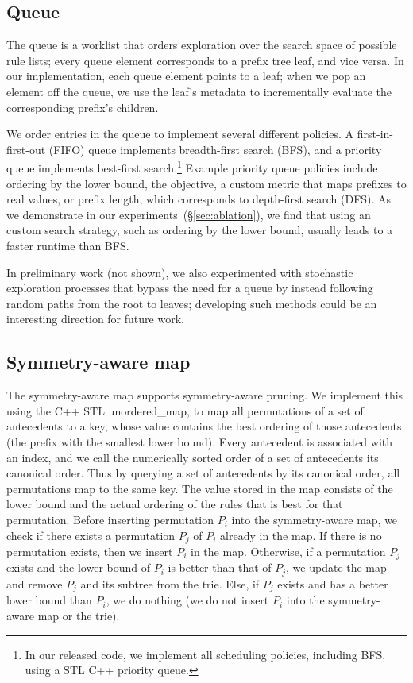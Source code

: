 \subsection{Queue}
\label{sec:queue}

The queue is a worklist that orders exploration over the search space of possible
rule lists; every queue element corresponds to a prefix tree leaf, and vice versa.
%
In our implementation, each queue element points to a leaf;
when we pop an element off the queue, we use the leaf's metadata to
incrementally evaluate the corresponding prefix's children.

We order entries in the queue to implement several different policies.
%
A first-in-first-out (FIFO) queue implements breadth-first search (BFS),
and a priority queue implements best-first search.\footnote{In our released code,
we implement all scheduling policies, including BFS, using a STL C++ priority queue.}
%
Example priority queue policies include ordering
by the lower bound, the objective, a custom metric that maps prefixes to real values,
or prefix length, which corresponds to depth-first search (DFS).
%
As we demonstrate in our experiments~(\S\ref{sec:ablation}),
we find that using an custom search strategy,
such as ordering by the lower bound, usually leads to a faster runtime than BFS.

In preliminary work (not shown), we also experimented with
stochastic exploration processes that bypass the need for a queue
by instead following random paths from the root to leaves;
developing such methods could be an interesting direction for future work.

\subsection{Symmetry-aware map}
\label{sec:pmap}

The symmetry-aware map supports symmetry-aware pruning.
We implement this using the C++ STL unordered\_map, to map all permutations of a set of antecedents to a key, whose value
contains the best ordering of those antecedents (\ie the prefix with the smallest lower bound).
Every antecedent is associated with an index, and we call the numerically sorted order of a set of antecedents its canonical order.
Thus by querying a set of antecedents by its canonical order, all permutations map to the same key.
The value stored in the map consists of the lower bound and the actual ordering of the rules that is best for that permutation.
Before inserting permutation $P_i$ into the symmetry-aware map, we check if there exists a permutation $P_j$ of $P_i$ already in the map.
If there is no permutation exists, then we insert $P_i$ in the map.
Otherwise, if a permutation $P_j$ exists and the lower bound of $P_i$ is better than that of $P_j$, we update the map and remove $P_j$ and its subtree from the trie.
Else, if $P_j$ exists and has a better lower bound than $P_i$, we do nothing  (\ie we do not insert $P_i$ into the symmetry-aware map or the trie).

